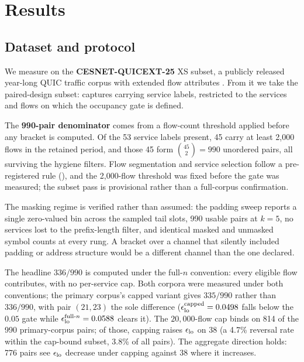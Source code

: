 \section{Results}
\label{sec:results}

\subsection{Dataset and protocol}
\label{sec:results/datasets}

We measure on the \textbf{CESNET-QUICEXT-25} XS subset, a publicly released
year-long QUIC traffic corpus with extended flow attributes
\citep{cesnet2025cesnet}. From it we take the paired-design subset: captures
carrying service labels, restricted to the services and flows on which the
occupancy gate is defined.

The \textbf{990-pair denominator} comes from a flow-count threshold applied
before any bracket is computed. Of the 53 service labels present, 45 carry at
least 2{,}000 flows in the retained period, and those 45 form
$\binom{45}{2} = 990$ unordered pairs, all surviving the hygiene filters. Flow
segmentation and service selection follow a pre-registered rule
(), and the 2{,}000-flow threshold was fixed before the gate was
measured; the subset pass is provisional rather than a full-corpus confirmation.

The masking regime is verified rather than assumed: the padding sweep reports a
single zero-valued bin across the sampled tail slots, 990 usable pairs at
$k{=}5$, no services lost to the prefix-length filter, and identical masked and
unmasked symbol counts at every rung. A bracket over a channel that silently
included padding or address structure would be a different channel than the one
declared.

The headline $336/990$ is computed under the full-$n$ convention: every eligible
flow contributes, with no per-service cap. Both corpora were measured under both
conventions; the primary corpus's capped variant gives $335/990$ rather than
$336/990$, with pair $(21,23)$ the sole difference
($\epsilon_{\mathrm{lo}}^{\mathrm{capped}} = 0.0498$ falls below the $0.05$ gate while
$\epsilon_{\mathrm{lo}}^{\text{full-}n} = 0.0588$ clears it). The
$20{,}000$-flow cap binds on 814 of the 990 primary-corpus pairs; of those,
capping raises $\epsilon_{\mathrm{lo}}$ on 38 (a 4.7\% reversal rate within the
cap-bound subset, 3.8\% of all pairs). The aggregate direction holds: 776 pairs
see $\epsilon_{\mathrm{lo}}$ decrease under capping against 38 where it increases.

